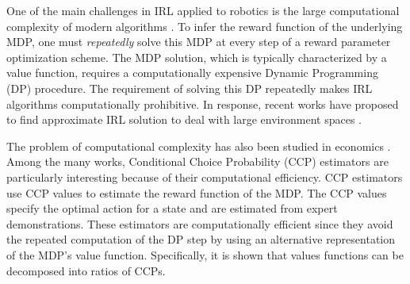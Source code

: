 \documentclass{article}
\begin{document}

One of the main challenges in IRL applied to robotics is the large computational complexity of modern algorithms \cite{ziebart, Ratliff2006}. 
To infer the reward function of the underlying MDP, one must \textit{repeatedly} solve this MDP at every step of a reward parameter optimization scheme.
The MDP solution, which is typically characterized by a value function, requires a computationally expensive Dynamic Programming (DP) procedure. The requirement of solving this DP repeatedly makes IRL algorithms computationally prohibitive.
In response, recent works have proposed  to find approximate IRL solution to deal with large environment spaces \cite{finn2016guided, levine2012continuous, huang2015approximate}.

The problem of computational complexity has also been studied in economics \cite{hotz, su2012constrained, aguirregabiria2002swapping}. Among the many works, Conditional Choice Probability (CCP) estimators \cite{hotz} are particularly interesting because of their computational efficiency.
CCP estimators use CCP values to estimate the reward function of the MDP.
The CCP values specify the optimal action for a state and are estimated from expert demonstrations.
These estimators are computationally efficient since they avoid the repeated computation of the DP step by using an alternative representation of the MDP's value function. Specifically, it is shown that values functions can be decomposed into ratios of CCPs.
\end{document}
